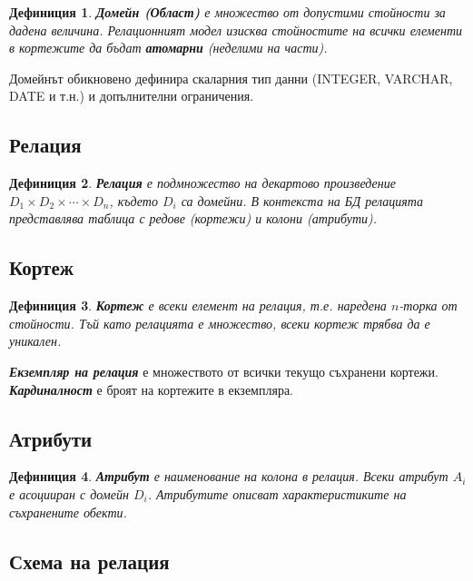 \documentclass{scrartcl}
\newtheorem{definition}{Дефиниция}
\begin{document}
\begin{FlushLeft}
\begin{definition}
\textbf{\textit{Домейн (Област)}} е множество от допустими стойности за дадена величина. Релационният модел изисква стойностите на всички елементи в кортежите да бъдат \textbf{атомарни} (неделими на части).
\end{definition}

Домейнът обикновено дефинира скаларния тип данни (INTEGER, VARCHAR, DATE и т.н.) и допълнителни ограничения.

\subsection{Релация}

\begin{definition}
\textbf{\textit{Релация}} е подмножество на декартово произведение $D_1 \times D_2 \times \cdots \times D_n$, където $D_i$ са домейни. В контекста на БД релацията представлява таблица с редове (кортежи) и колони (атрибути).
\end{definition}

\subsection{Кортеж}

\begin{definition}
\textbf{\textit{Кортеж}} е всеки елемент на релация, т.е. наредена $n$-торка от стойности. Тъй като релацията е множество, всеки кортеж трябва да е уникален.
\end{definition}

\textbf{\textit{Екземпляр на релация}} е множеството от всички текущо съхранени кортежи. \textbf{\textit{Кардиналност}} е броят на кортежите в екземпляра.

\subsection{Атрибути}

\begin{definition}
\textbf{\textit{Атрибут}} е наименование на колона в релация. Всеки атрибут $A_i$ е асоцииран с домейн $D_i$. Атрибутите описват характеристиките на съхранените обекти.
\end{definition}

\subsection{Схема на релация}


\end{FlushLeft}
\end{document}
